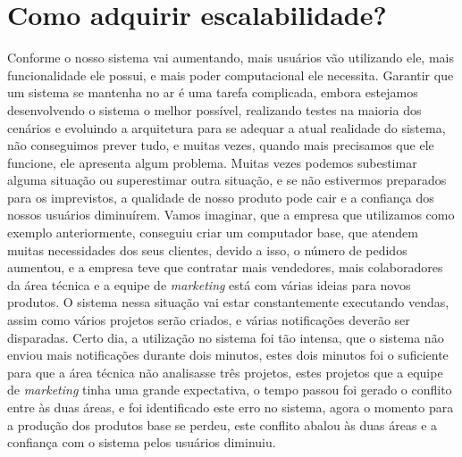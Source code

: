   \chapter{Como adquirir escalabilidade?}
    Conforme o nosso sistema vai aumentando, mais usuários vão utilizando ele,
    mais funcionalidade ele possui, e mais poder computacional ele necessita.
    Garantir que um sistema se mantenha no ar é uma tarefa complicada, embora
    estejamos desenvolvendo o sistema o melhor possível, realizando testes
    na maioria dos cenários e evoluindo a arquitetura para se adequar a atual
    realidade do sistema, não conseguimos prever tudo, e muitas vezes, quando
    mais precisamos que ele funcione, ele apresenta algum problema. Muitas vezes
    podemos subestimar alguma situação ou superestimar outra situação, e se não
    estivermos preparados para os imprevistos, a qualidade de nosso produto pode
    cair e a confiança dos nossos usuários diminuírem. \newline
    Vamos imaginar, que a empresa que utilizamos como exemplo anteriormente,
    conseguiu criar um computador base, que atendem muitas necessidades dos seus
    clientes, devido a isso, o número de pedidos aumentou, e a empresa teve que
    contratar mais vendedores, mais colaboradores da área técnica e a equipe de
    \textit{marketing} está com várias ideias para novos produtos. O sistema
    nessa situação vai estar constantemente executando vendas, assim como vários
    projetos serão criados, e várias notificações deverão ser disparadas. Certo
    dia, a utilização no sistema foi tão intensa, que o sistema não enviou mais
    notificações durante dois minutos, estes dois minutos foi o suficiente para
    que a área técnica não analisasse três projetos, estes projetos que a equipe
    de \textit{marketing} tinha uma grande expectativa, o tempo passou foi gerado
    o conflito entre às duas áreas, e foi identificado este erro no sistema,
    agora o momento para a produção dos produtos base se perdeu, este conflito
    abalou às duas áreas e a confiança com o sistema pelos usuários diminuiu.

